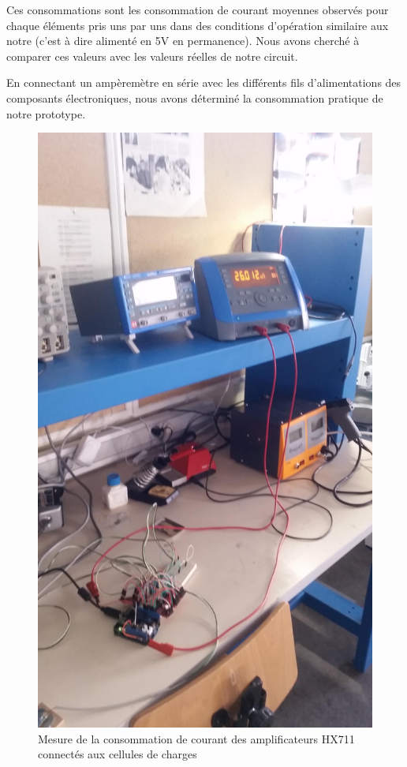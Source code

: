 \documentclass{polytech/polytech}
\begin{document}
Ces consommations sont les consommation  de courant moyennes observés pour chaque éléments pris uns par uns dans des conditions d'opération similaire aux notre (c'est à dire alimenté en 5V en permanence). 
Nous avons cherché à comparer ces valeurs avec les valeurs réelles de notre circuit.

En connectant un ampèremètre en série avec les différents fils d'alimentations des composants électroniques, nous avons déterminé la consommation pratique de notre prototype.

\begin{figure}[htbp]
\begin{center}
\includegraphics[width=12cm]{image/mesure_de_consommation1}
\end{center}
\caption{Mesure de la consommation de courant des amplificateurs HX711 connectés aux cellules de charges}
\label{fig:mesure_amper_hx711}
\end{figure}
\end{document}
